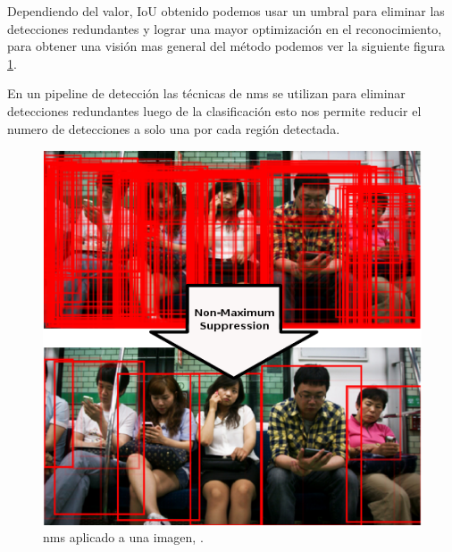 Dependiendo del valor, IoU  obtenido podemos usar un umbral para  eliminar las detecciones redundantes y lograr una mayor optimización  en el reconocimiento, para obtener una visión mas general del método podemos ver la siguiente figura \ref{Fig: nonmaximumsuppression}. 

En un pipeline de detección las técnicas de \ac{nms}  se utilizan para eliminar detecciones redundantes luego de la clasificación esto nos permite reducir el numero de detecciones a solo una por cada región detectada.

\begin{figure}[H]
 \centering
  \includegraphics[scale=0.4,keepaspectratio=true,clip=true]{imagenes/MarcoTeorico/nms.png}
  \caption{\ac{nms} aplicado a una imagen, \citep{nms2}.}\label{Fig: nonmaximumsuppression}
\end{figure}


